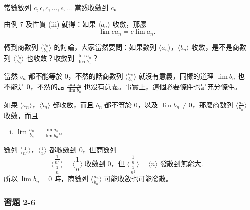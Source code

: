 \begin{example}\label{ex:b2_2-5-7}
常數數列 $c, c, c, \dots, c, \dots$ 當然收斂到 $c$。
\end{example}

\begin{example}\label{ex:b2_2-5-8}
由例 7 及性質 (iii) 就得：如果 $\langle a_n \rangle$ 收斂，那麼
\[
\lim c a_n = c \lim a_n.
\]
\end{example}

轉到商數列 $\langle \frac{a_n}{b_n} \rangle$ 的討論，大家當然要問：如果數列 $\langle a_n \rangle$，$\langle b_n \rangle$ 收斂，是不是商數列 $\langle \frac{a_n}{b_n} \rangle$ 也收斂？收斂到 $\frac{\lim a_n}{\lim b_n}$？

當然 $b_n$ 都不能等於 0，不然的話商數列 $\langle \frac{a_n}{b_n} \rangle$ 就沒有意義，同樣的道理 $\lim b_n$ 也不能是 0，不然的話 $\frac{\lim a_n}{\lim b_n}$ 也沒有意義。事實上，這個必要條件也是充分條件。

如果 $\langle a_n \rangle$，$\langle b_n \rangle$ 都收斂，而且 $b_n$ 都不等於 0，以及 $\lim b_n \ne 0$，那麼商數列 $\langle \frac{a_n}{b_n} \rangle$ 收斂，而且
\begin{enumerate}[(iv)]
    \item $\lim\frac{a_n}{b_n} = \frac{\lim a_n}{\lim b_n}$。
\end{enumerate}

\begin{example}\label{ex:b2_2-5-9}
數列 $\langle \frac{1}{n^2} \rangle$，$\langle \frac{1}{n} \rangle$ 都收斂到 0，但商數列
\[
\langle \frac{\frac{1}{n^2}}{\frac{1}{n}} \rangle = \langle \frac{1}{n} \rangle \text{ 收斂到 0，但 } \langle \frac{\frac{1}{n}}{\frac{1}{n^2}} \rangle = \langle n \rangle \text{ 發散到無窮大}.
\]
所以 $\lim b_n = 0$ 時，商數列 $\langle \frac{a_n}{b_n} \rangle$ 可能收斂也可能發散。
\end{example}

\subsubsection*{習題 2-6}

